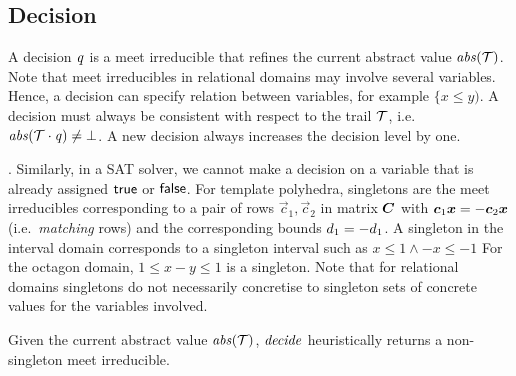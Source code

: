 \subsection{Decision}
A decision $\mathit{q}$ is a meet irreducible that refines the
current abstract value $\mathit{abs}(\mathcal{T})$.  Note that meet irreducibles in
relational domains may involve several variables.
%
%
Hence, a decision can specify relation between variables, for example 
$\{x \leq y)$.  A decision must always be consistent with respect to 
the trail $\mathcal{T}$, i.e.\ $\mathit{abs}(\mathcal{T}\cdot \mathit{q})\neq \bot$.  
A new decision always increases the decision level by one. 

.
Similarly, in a SAT solver, we cannot make a decision on a 
variable that is already assigned $\mathsf{true}$ or $\mathsf{false}$.
%
For template polyhedra, singletons are the meet irreducibles
corresponding to a pair of rows $\vec{c}_1,\vec{c}_2$ in matrix
${\boldsymbol C}$ with ${\boldsymbol c}_1{\boldsymbol {x}}=-{\boldsymbol c}_2{\boldsymbol {x}}$
(i.e.\ \emph{matching} rows) and the corresponding bounds
$d_1=-d_1$.
%
A singleton in the interval domain corresponds to a singleton interval
such as $x\leq 1 \wedge -x\leq -1$ For the octagon domain, $1 \leq x-y
\leq 1$ is a singleton.
%
%
Note that for relational domains singletons do not necessarily
concretise to singleton sets of concrete values for the variables
involved.


Given 
the current abstract value $\mathit{abs}(\mathcal{T})$, $\mathit{decide}$ heuristically
returns a non-singleton meet irreducible.

